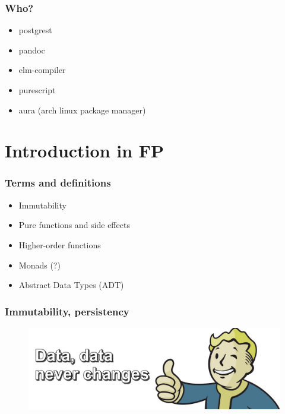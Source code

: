 \documentclass[18pt, compress, aspectratio=169]{beamer}
\begin{document}
\begin{frame}[fragile]
    \frametitle{Who?}
    \begin{itemize}[label={\MVRightarrow}]
        \item postgrest
        \item pandoc
        \item elm-compiler
        \item purescript
        \item aura (arch linux package manager)
    \end{itemize}
\end{frame}

\section{Introduction in FP}

\begin{frame}[fragile]
    \frametitle{Terms and definitions}
    \begin{itemize}[label={\MVRightarrow}]
        \item Immutability
        \item Pure functions and side effects
        \item Higher-order functions
        \item Monads (?)
        \item Abstract Data Types (ADT)
    \end{itemize}
\end{frame}

\begin{frame}
    \frametitle{Immutability, persistency}
    \vspace{-10pt}
    \begin{figure}
        \includegraphics[width=1.1\textwidth,center]{Vault_Boy_text.png}
    \end{figure}
\end{frame}
\end{document}
